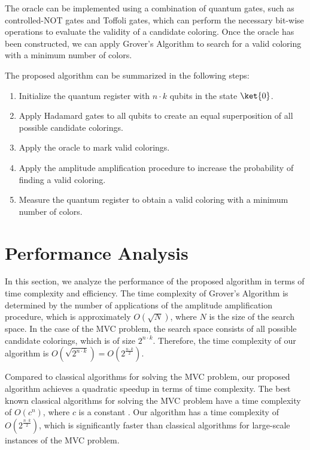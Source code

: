 The oracle can be implemented using a combination of quantum gates, such as controlled-NOT gates and Toffoli gates, which can perform the necessary bit-wise operations to evaluate the validity of a candidate coloring. Once the oracle has been constructed, we can apply Grover's Algorithm to search for a valid coloring with a minimum number of colors.

The proposed algorithm can be summarized in the following steps:

\begin{enumerate}
\item Initialize the quantum register with $n \cdot k$ qubits in the state $\ket{0}$.
\item Apply Hadamard gates to all qubits to create an equal superposition of all possible candidate colorings.
\item Apply the oracle to mark valid colorings.
\item Apply the amplitude amplification procedure to increase the probability of finding a valid coloring.
\item Measure the quantum register to obtain a valid coloring with a minimum number of colors.
\end{enumerate}

\section{Performance Analysis}
\label{sec:analysis}

In this section, we analyze the performance of the proposed algorithm in terms of time complexity and efficiency. The time complexity of Grover's Algorithm is determined by the number of applications of the amplitude amplification procedure, which is approximately $O(\sqrt{N})$, where $N$ is the size of the search space. In the case of the MVC problem, the search space consists of all possible candidate colorings, which is of size $2^{n \cdot k}$. Therefore, the time complexity of our algorithm is $O(\sqrt{2^{n \cdot k}}) = O(2^{\frac{n \cdot k}{2}})$.

Compared to classical algorithms for solving the MVC problem, our proposed algorithm achieves a quadratic speedup in terms of time complexity. The best known classical algorithms for solving the MVC problem have a time complexity of $O(c^n)$, where $c$ is a constant \cite{zuckerman2006linear}. Our algorithm has a time complexity of $O(2^{\frac{n \cdot k}{2}})$, which is significantly faster than classical algorithms for large-scale instances of the MVC problem.

